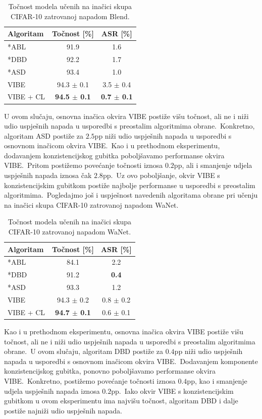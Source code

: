 \documentclass[diplomskirad]{fer}
\begin{document}
\begin{table}[htb]
  \caption{Točnost modela učenih na inačici skupa CIFAR-10 zatrovanoj napadom Blend.}
  \label{tbl:usporedba_blend}
  \centering
  \begin{tabular}{l||cc}
  Algoritam & Točnost [\%] & ASR [\%]\\ \hline \hline
  *ABL & 91.9 & 1.6 \\
  *DBD & 92.2 & 1.7 \\
  *ASD & 93.4 & 1.0 \\ \hline
  VIBE & 94.3 $\pm$ 0.1 & 3.5 $\pm$ 0.4 \\
  VIBE + CL & \textbf{94.5 $\pm$ 0.1} & \textbf{0.7 $\pm$ 0.1} \\
  \end{tabular}
\end{table}

U ovom slučaju, osnovna inačica okvira VIBE postiže višu točnost, ali ne i niži udio uspješnih napada u usporedbi s preostalim algoritmima obrane.\ 
Konkretno, algoritam ASD postiže za $2.5$pp niži udio uspješnih napada u usporedbi s osnovnom inačicom okvira VIBE.\ 
Kao i u prethodnom eksperimentu, dodavanjem konzistencijskog gubitka poboljšavamo performanse okvira VIBE.\ Pritom postižemo povećanje točnosti iznosa $0.2$pp, ali i smanjenje udjela uspješnih napada iznosa čak $2.8$pp.\ 
Uz ovo poboljšanje, okvir VIBE s konzistencijskim gubitkom postiže najbolje performanse u usporedbi s preostalim algoritmima.\ 
Pogledajmo još i uspješnost navedenih algoritama obrane pri učenju na inačici skupa CIFAR-10 zatrovanoj napadom WaNet.\ 

\begin{table}[htb]
  \caption{Točnost modela učenih na inačici skupa CIFAR-10 zatrovanoj napadom WaNet.}
  \label{tbl:usporedba_wanet}
  \centering
  \begin{tabular}{l||cc}
  Algoritam & Točnost [\%] & ASR [\%]\\ \hline \hline
  *ABL & 84.1 & 2.2 \\
  *DBD & 91.2 & \textbf{0.4} \\
  *ASD & 93.3 & 1.2 \\ \hline
  VIBE & 94.3 $\pm$ 0.2 & 0.8 $\pm$ 0.2 \\
  VIBE + CL & \textbf{94.7 $\pm$ 0.1} & 0.6 $\pm$ 0.1 \\
  \end{tabular}
\end{table}

\pagebreak

Kao i u prethodnom eksperimentu, osnovna inačica okvira VIBE postiže višu točnost, ali ne i niži udio uspješnih napada u usporedbi s preostalim algoritmima obrane.\ 
U ovom slučaju, algoritam DBD postiže za $0.4$pp niži udio uspješnih napada u usporedbi s osnovnom inačicom okvira VIBE.\ 
Dodavanjem komponente konzistencijskog gubitka, ponovno poboljšavamo performanse okvira VIBE.\ Konkretno, postižemo povećanje točnosti iznosa $0.4$pp, kao i smanjenje udjela uspješnih napada iznosa $0.2$pp.\ 
Iako okvir VIBE s konzistencijskim gubitkom u ovom eksperimentu ima najvišu točnost, algoritam DBD i dalje postiže najniži udio uspješnih napada.\ 
\end{document}

